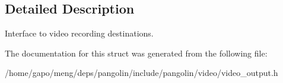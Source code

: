 \subsection{Detailed Description}
Interface to video recording destinations. 

The documentation for this struct was generated from the following file\+:\begin{DoxyCompactItemize}
\item 
/home/gapo/meng/deps/pangolin/include/pangolin/video/video\+\_\+output.\+h\end{DoxyCompactItemize}
